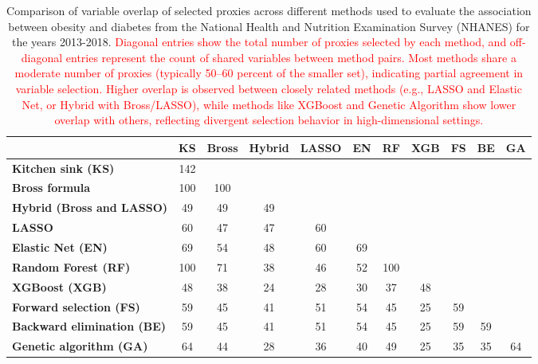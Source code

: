 \documentclass[10pt,letterpaper]{article}
\begin{document}
\begin{landscape} 

\begin{table}[htbp]
\centering
\caption{Comparison of variable overlap of selected proxies across different methods used to evaluate the association between obesity and diabetes from the National Health and Nutrition Examination Survey (NHANES) for the years 2013-2018. \textcolor{red}{Diagonal entries show the total number of proxies selected by each method, and off-diagonal entries represent the count of shared variables between method pairs. Most methods share a moderate number of proxies (typically 50–60 percent of the smaller set), indicating partial agreement in variable selection. Higher overlap is observed between closely related methods (e.g., LASSO and Elastic Net, or Hybrid with Bross/LASSO), while methods like XGBoost and Genetic Algorithm show lower overlap with others, reflecting divergent selection behavior in high-dimensional settings.}}
\label{tab:method-comparison-updated}
\begin{tabular}{lcccccccccc}
\toprule
 & \textbf{KS} & \textbf{Bross} & \textbf{Hybrid} & \textbf{LASSO} & \textbf{EN} & \textbf{RF} & \textbf{XGB} & \textbf{FS} & \textbf{BE} & \textbf{GA} \\
\midrule
\textbf{Kitchen sink (KS)} & 142 & & & & & & & & & \\
\textbf{Bross formula} & 100 & 100 & & & & & & & & \\
\textbf{Hybrid (Bross and LASSO)} & 49 & 49 & 49 & & & & & & & \\
\textbf{LASSO} & 60 & 47 & 47 & 60 & & & & & & \\
\textbf{Elastic Net (EN)} & 69 & 54 & 48 & 60 & 69 & & & & & \\
\textbf{Random Forest (RF)} & 100 & 71 & 38 & 46 & 52 & 100 & & & & \\  
\textbf{XGBoost (XGB)} & 48 & 38 & 24 & 28 & 30 & 37 & 48 & & & \\
\textbf{Forward selection (FS)} & 59 & 45 & 41 & 51 & 54 & 45 & 25 & 59 & & \\
\textbf{Backward elimination (BE)} & 59 & 45 & 41 & 51 & 54 & 45 & 25 & 59 & 59 & \\
\textbf{Genetic algorithm (GA)} & 64 & 44 & 28 & 36 & 40 & 49 & 25 & 35 & 35 & 64 \\
\bottomrule
\end{tabular}
\end{table}

\end{landscape}
\end{document}
